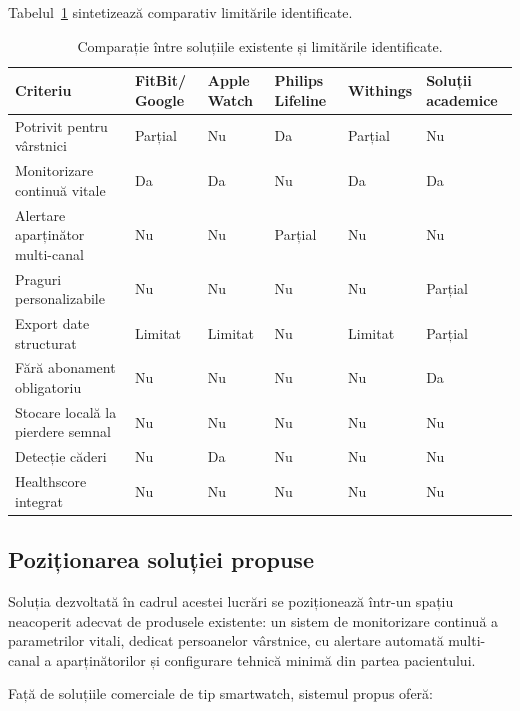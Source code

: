 \documentclass[12pt,a4paper,twoside]{article}
\begin{document}
Tabelul~\ref{tab:comparatie} sintetizează comparativ limitările identificate.

\begin{table}[H]
\centering
\small
\renewcommand{\arraystretch}{1.3}
\begin{tabular}{|>{\raggedright\arraybackslash}p{3.0cm}|p{1.7cm}|p{1.7cm}|p{1.9cm}|p{1.5cm}|p{1.9cm}|}
\hline
\textbf{Criteriu} & \textbf{FitBit/ Google} & \textbf{Apple Watch} & \textbf{Philips Lifeline} & \textbf{Withings} & \textbf{Soluții academice}\\
\hline
Potrivit pentru vârstnici & Parțial & Nu & Da & Parțial & Nu\\
\hline
Monitorizare continuă vitale & Da & Da & Nu & Da & Da\\
\hline
Alertare aparținător multi-canal & Nu & Nu & Parțial & Nu & Nu\\
\hline
Praguri personalizabile & Nu & Nu & Nu & Nu & Parțial\\
\hline
Export date structurat & Limitat & Limitat & Nu & Limitat & Parțial\\
\hline
Fără abonament obligatoriu & Nu & Nu & Nu & Nu & Da\\
\hline
Stocare locală la pierdere semnal & Nu & Nu & Nu & Nu & Nu\\
\hline
Detecție căderi & Nu & Da & Nu & Nu & Nu\\
\hline
Healthscore integrat & Nu & Nu & Nu & Nu & Nu\\
\hline
\end{tabular}
\caption{Comparație între soluțiile existente și limitările identificate.}
\label{tab:comparatie}
\end{table}

\subsection{Poziționarea soluției propuse}

Soluția dezvoltată în cadrul acestei lucrări se poziționează într-un spațiu neacoperit adecvat de produsele existente: un sistem de monitorizare continuă a parametrilor vitali, dedicat persoanelor vârstnice, cu alertare automată multi-canal a aparținătorilor și configurare tehnică minimă din partea pacientului.

Față de soluțiile comerciale de tip smartwatch, sistemul propus oferă:
\end{document}

